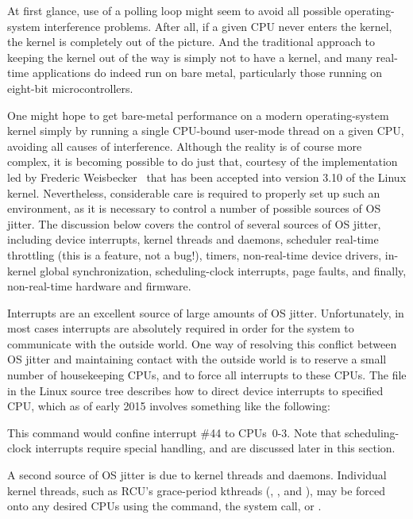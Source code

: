 At first glance, use of a polling loop might seem to avoid all possible
operating-system interference problems.
After all, if a given CPU never enters the kernel, the kernel is
completely out of the picture.
And the traditional approach to keeping the kernel out of the way is
simply not to have a kernel, and many real-time applications do
indeed run on bare metal, particularly those running on eight-bit
microcontrollers.

One might hope to get bare-metal performance on a modern operating-system
kernel simply by running a single CPU-bound user-mode thread on a
given CPU, avoiding all causes of interference.
Although the reality is of course more complex, it is becoming
possible to do just that,
courtesy of the  implementation led by
Frederic Weisbecker~\cite{JonCorbet2013NO-HZ-FULL} that has been
accepted into version 3.10 of the Linux kernel.
Nevertheless, considerable care is required to properly set up such
an environment, as it is necessary to control a number of possible
sources of OS jitter.
The discussion below covers the control of several sources of OS
jitter, including device interrupts, kernel threads and daemons,
scheduler real-time throttling (this is a feature, not a bug!),
timers, non-real-time device drivers, in-kernel global synchronization,
scheduling-clock interrupts, page faults, and finally, non-real-time
hardware and firmware.

Interrupts are an excellent source of large amounts of OS jitter.
Unfortunately, in most cases interrupts are absolutely required in order
for the system to communicate with the outside world.
One way of resolving this conflict between OS jitter and maintaining
contact with the outside world is to reserve a small number of
housekeeping CPUs, and to force all interrupts to these CPUs.
The  file in the Linux source tree
describes how to direct device interrupts to specified CPU,
which as of early 2015 involves something like the following:

\begin{quote}
	\scriptsize
\end{quote}

This command would confine interrupt \#44 to CPUs~0-3.
Note that scheduling-clock interrupts require special handling, and are
discussed later in this section.

A second source of OS jitter is due to kernel threads and daemons.
Individual kernel threads, such as RCU's grace-period kthreads
(, , and ), may be forced
onto any desired CPUs using the  command, the
 system call, or .

